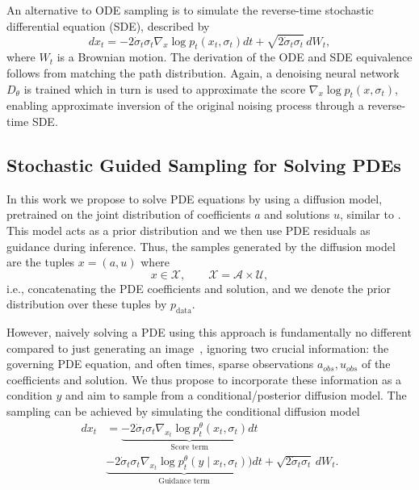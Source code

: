 An alternative to ODE sampling is to simulate the reverse-time stochastic differential equation (SDE), described by  
\begin{equation}
    d x_t = -2\Dot{\sigma}_t \sigma_t \nabla_x \log p_t(x_t, \sigma_t)dt + \sqrt{2 \Dot{\sigma}_t \sigma_t} \, dW_t,  
    \label{eq:reverse_sde_noise_form}
\end{equation}
where $W_t$ is a Brownian motion. 
The derivation of the ODE and SDE equivalence follows from matching the path distribution. 
Again, a denoising neural network $D_\theta$ is trained which in turn is used to approximate the score $\nabla_x \log p_t(x, \sigma_t)$, enabling approximate inversion of the original noising process through a reverse-time SDE. 

\subsection{Stochastic Guided Sampling for Solving PDEs}
In this work we propose to solve PDE equations by using a diffusion model, pretrained on the joint distribution of coefficients $a$ and solutions $u$, similar to \citet{huang2024diffusionpdegenerativepdesolvingpartial}. This model acts as a prior distribution and we then use PDE residuals as guidance during inference. Thus, the samples generated by the diffusion model are the tuples $x = (a,u)$ where
\begin{equation}
x \in \mathcal{X}, \qquad \mathcal{X} = \mathcal{A} \times \mathcal{U},
\end{equation}
i.e., concatenating the PDE coefficients and solution, and we denote the prior distribution over these tuples by $p_{\mathrm{data}}$.  

However, naively solving a PDE using this approach is fundamentally no different compared to just generating an image~\citep[see, e.g.,][]{yang2023denoising}, ignoring two crucial information: the governing PDE equation, and often times, sparse observations $a_{obs}, u_{obs}$ of the coefficients and solution. 
We thus propose to incorporate these information as a condition $y$ and aim to sample from a conditional/posterior diffusion model. 
The sampling can be achieved by simulating the conditional diffusion model
\begin{equation}
    \begin{split}
        dx_t 
        &= \underbrace{-2\Dot{\sigma}_t \sigma_t \nabla_{x_t} \log p_t^\theta(x_t, \sigma_t)dt}_{\text{Score term}} \\
        &\underbrace{-2\Dot{\sigma}_t \sigma_t \nabla_{x_t} \log p_t^\theta(y \mid x_t, \sigma_t))dt}_{\text{Guidance term}} + \sqrt{2 \Dot{\sigma}_t \sigma_t} \, dW_t.
        \label{eq:guidance_sde_noise}
    \end{split}
\end{equation}

